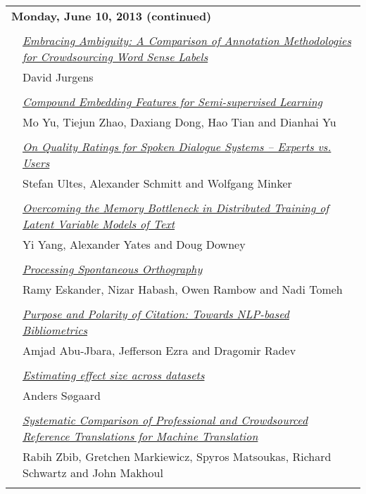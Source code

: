 \begin{tabular}{p{20mm}p{138mm}}
\\
\multicolumn{2}{l}{\bf Monday, June 10, 2013
 (continued)} \\\\
 & \hyperlink{page.556}{\em Embracing Ambiguity: A Comparison of Annotation Methodologies for Crowdsourcing Word Sense Labels}\\
         & David Jurgens \\
\\

 & \hyperlink{page.563}{\em Compound Embedding Features for Semi-supervised Learning}\\
         & Mo Yu, Tiejun Zhao, Daxiang Dong, Hao Tian and Dianhai Yu \\
\\

 & \hyperlink{page.569}{\em On Quality Ratings for Spoken Dialogue Systems -- Experts vs. Users}\\
         & Stefan Ultes, Alexander Schmitt and Wolfgang Minker \\
\\

 & \hyperlink{page.579}{\em Overcoming the Memory Bottleneck in Distributed Training of Latent Variable Models of Text}\\
         & Yi Yang, Alexander Yates and Doug Downey \\
\\

 & \hyperlink{page.585}{\em Processing Spontaneous Orthography}\\
         & Ramy Eskander, Nizar Habash, Owen Rambow and Nadi Tomeh \\
\\

 & \hyperlink{page.596}{\em Purpose and Polarity of Citation: Towards NLP-based Bibliometrics}\\
         & Amjad Abu-Jbara, Jefferson Ezra and Dragomir Radev \\
\\

 & \hyperlink{page.607}{\em Estimating effect size across datasets}\\
         & Anders S{\o}gaard \\
\\

 & \hyperlink{page.612}{\em Systematic Comparison of Professional and Crowdsourced Reference Translations for Machine Translation}\\
         & Rabih Zbib, Gretchen Markiewicz, Spyros Matsoukas, Richard Schwartz and John Makhoul \\
\\


\end{tabular}
